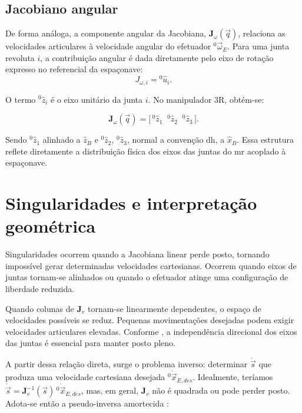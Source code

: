 \subsection{Jacobiano angular}

De forma análoga, a componente angular da Jacobiana, $\mathbf{J}_{\omega}(\vec q)$, relaciona as velocidades articulares à velocidade angular do efetuador ${}^{0}\!\vec{\omega}_{E}$. Para uma junta revoluta $i$, a contribuição angular é dada diretamente pelo eixo de rotação expresso no referencial da espaçonave:
\begin{equation}
J_{\omega,i} = {}^{0}\!\hat{u}_{i}.
\end{equation}

O termo ${}^{0}\!\hat{z}_{i}$ é o eixo unitário da junta $i$. No manipulador 3R, obtém-se:

\begin{equation}
\mathbf{J}_{\omega}(\vec q)=
\bigl[\,{}^{0}\!\hat{z}_{1}\;\;{}^{0}\!\hat{z}_{2}\;\;{}^{0}\!\hat{z}_{3}\,\bigr].
\end{equation}

Sendo ${}^{0}\!\hat{z}_{1}$ alinhado a $\hat{z}_{B}$ e ${}^{0}\!\hat{z}_{2}$, ${}^{0}\!\hat{z}_{3}$, normal a convenção \gls{dh}, a $\hat{x}_{B}$.
Essa estrutura reflete diretamente a distribuição física dos eixos das juntas do \gls{mr} acoplado à espaçonave.

\section{Singularidades e interpretação geométrica}
\label{sec_singularidades_jacobiana}

Singularidades ocorrem quando a Jacobiana linear perde posto, tornando impossível gerar determinadas velocidades cartesianas.
Ocorrem quando eixos de juntas tornam-se alinhados ou quando o efetuador atinge uma configuração de liberdade reduzida.

Quando colunas de $\mathbf{J}_{v}$ tornam-se linearmente dependentes, o espaço de velocidades possíveis se reduz. Pequenas movimentações desejadas podem exigir velocidades articulares elevadas. Conforme \cite{craig2005}, a independência direcional dos eixos das juntas é essencial para manter posto pleno.

A partir dessa relação direta, surge o problema inverso:
determinar $\dot{\vec{s}}$ que produza uma velocidade cartesiana desejada ${}^{0}\!\dot{\vec{x}}_{E,des}$.
Idealmente, teríamos
$\dot{\vec{s}} = \mathbf{J}_{v}^{-1}(\vec{s})\,{}^{0}\!\dot{\vec{x}}_{E,des}$,
mas, em geral, $\mathbf{J}_{v}$ não é quadrada ou pode perder posto.
Adota-se então a pseudo-inversa amortecida \cite{sciavicco_siciliano2010}:

